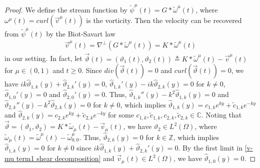 \documentclass[1 [leqno, 11pt]{amsart}
\numberwithin{equation}{section}
\begin{document}
\begin{CJK*}{GBK}{song}
\begin{appendix}
\begin{proof}
We define the stream function by $\tilde \psi^\mu(t)=G*\tilde \omega^\mu(t)$, where $\omega^\mu(t)=curl(\vec{v}^{\mu}(t))$ is the vorticity. Then the velocity can be recovered from $\tilde \psi^\mu(t)$ by the Biot-Savart law
\begin{align}\label{B-S law}
\vec{v}^{\mu}(t)=\nabla^{\bot} (G*\tilde \omega^\mu(t))=K*\tilde \omega^\mu(t)\end{align}
in our setting. In fact, let
 $\vec{\vartheta}(t)=({\vartheta}_1(t),{\vartheta}_2(t) )\triangleq K*\tilde \omega^\mu(t)-\vec{v}^{\mu}(t)$ for  $\mu\in(0,1)$ and $t\geq0$.
 Since $div(\vec{\vartheta}(t))=0$ and $curl(\vec{\vartheta}(t))=0$, we have $ik\widehat{\vartheta}_{1,k}(y)+\widehat{\vartheta}_{2,k}'(y)=0$, $\widehat{\vartheta}_{1,k}'(y)-ik\widehat{\vartheta}_{2,k}(y)=0$ for $k\neq0$, $\widehat{\vartheta}_{1,0}'(y)=0$ and $\widehat{\vartheta}_{2,0}'(y)=0$.
Thus, $\widehat{\vartheta}_{1,k}''(y)-k^2\widehat{\vartheta}_{1,k}(y)=0$ and $\widehat{\vartheta}_{2,k}''(y)-k^2\widehat{\vartheta}_{2,k}(y)=0$ for $k\neq0$, which implies $
\widehat{\vartheta}_{1,k}(y)=c_{1,k}e^{ky}+\tilde c_{1,k}e^{-ky}$ and $
\widehat{\vartheta}_{2,k}(y)=c_{2,k}e^{ky}+\tilde c_{2,k}e^{-ky}$ for some $c_{1,k},\tilde c_{1,k},c_{2,k},\tilde c_{2,k}\in\mathbb{C}$. Noting that
$\vec{\vartheta}= ({\vartheta}_1,{\vartheta}_2 )=K*\tilde \omega_\mu(t)-\vec{v}_{\mu}(t)$, we have ${\vartheta}_2\in L^2 (\Omega)$, where $\tilde \omega_\mu(t)=\tilde \omega^\mu(t)-\tilde \omega_{0,0}^\mu$. Thus, $\widehat{\vartheta}_{2,k}(y)=0$ for $k\in\mathbb{Z}$, which implies $\widehat{\vartheta}_{1,k}(y)=0$ for $k\neq0$  since $ik\widehat{\vartheta}_{1,k}(y)+\widehat{\vartheta}_{2,k}'(y)=0$. By the first limit in \eqref{v-mu term1 shear decomposition} and $\vec{v}_{\mu}(t)\in L^2 (\Omega)$, we have  $\widehat{\vartheta}_{1,0}(y)=0$.


\end{proof}
\end{appendix}
\end{CJK*}
\end{document}

